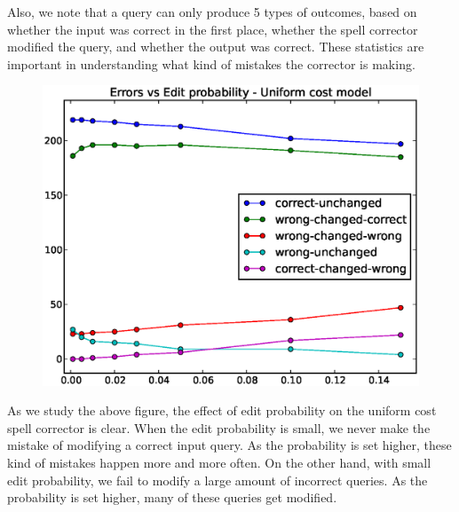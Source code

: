 \documentclass[10pt,twocolumn]{article}
\begin{document}
Also, we note that a query can only produce 5 types of outcomes, based on whether the input was correct in the first place, whether the spell corrector modified the query, and whether the output was correct. These statistics are important in understanding what kind of mistakes the corrector is making.
\begin{figure}[H]
\includegraphics[width=0.9\linewidth]{editprob_err}
\end{figure}
As we study the above figure, the effect of edit probability on the uniform cost spell corrector is clear. When the edit probability is small, we never make the mistake of modifying a correct input query. As the probability is set higher, these kind of mistakes happen more and more often. On the other hand, with small edit probability, we fail to modify a large amount of incorrect queries. As the probability is set higher, many of these queries get modified.



\end{document}
